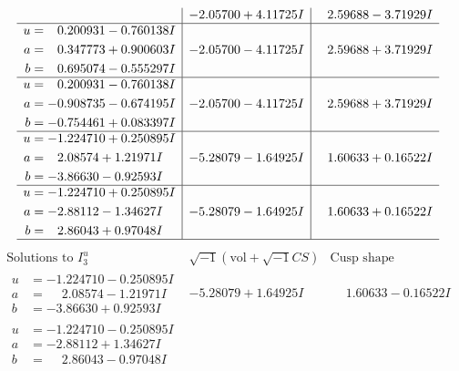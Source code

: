 \documentclass[1p]{elsarticle_modified}
\theoremstyle{definition}
\newcommand{\I}{\sqrt{-1}}
\begin{document}
$$\begin{array}{c|c|c}
 & -2.05700 + 4.11725 I & \phantom{-}2.59688 - 3.71929 I \\ \hline\begin{aligned}
u &= \phantom{-}0.200931 - 0.760138 I \\
a &= \phantom{-}0.347773 + 0.900603 I \\
b &= \phantom{-}0.695074 - 0.555297 I\end{aligned}
 & -2.05700 - 4.11725 I & \phantom{-}2.59688 + 3.71929 I \\ \hline\begin{aligned}
u &= \phantom{-}0.200931 - 0.760138 I \\
a &= -0.908735 - 0.674195 I \\
b &= -0.754461 + 0.083397 I\end{aligned}
 & -2.05700 - 4.11725 I & \phantom{-}2.59688 + 3.71929 I \\ \hline\begin{aligned}
u &= -1.224710 + 0.250895 I \\
a &= \phantom{-}2.08574 + 1.21971 I \\
b &= -3.86630 - 0.92593 I\end{aligned}
 & -5.28079 - 1.64925 I & \phantom{-}1.60633 + 0.16522 I \\ \hline\begin{aligned}
u &= -1.224710 + 0.250895 I \\
a &= -2.88112 - 1.34627 I \\
b &= \phantom{-}2.86043 + 0.97048 I\end{aligned}
 & -5.28079 - 1.64925 I & \phantom{-}1.60633 + 0.16522 I\\
 \hline 
 \end{array}$$\newpage$$\begin{array}{c|c|c}  
\text{Solutions to }I^u_{3}& \I (\text{vol} + \sqrt{-1}CS) & \text{Cusp shape}\\
 \hline 
\begin{aligned}
u &= -1.224710 - 0.250895 I \\
a &= \phantom{-}2.08574 - 1.21971 I \\
b &= -3.86630 + 0.92593 I\end{aligned}
 & -5.28079 + 1.64925 I & \phantom{-}1.60633 - 0.16522 I \\ \hline\begin{aligned}
u &= -1.224710 - 0.250895 I \\
a &= -2.88112 + 1.34627 I \\
b &= \phantom{-}2.86043 - 0.97048 I\end{aligned}

\end{array}$$
\end{document}

